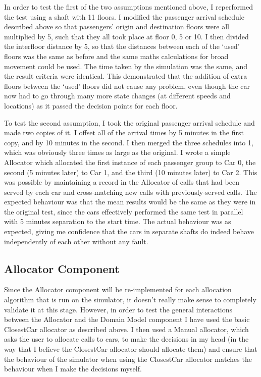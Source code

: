\documentclass{UoYCSproject}
\begin{document}
In order to test the first of the two assumptions mentioned above, I reperformed the test using a shaft with 11 floors.  I modified the passenger arrival schedule described above so that passengers' origin and destination floors were all multiplied by 5, such that they all took place at floor 0, 5 or 10.  I then divided the interfloor distance by 5, so that the distances between each of the `used' floors was the same as before and the same maths calculations for broad movement could be used.  The time taken by the simulation was the same, and the result criteria were identical.  This demonstrated that the addition of extra floors between the `used' floors did not cause any problem, even though the car now had to go through many more state changes (at different speeds and locations) as it passed the decision points for each floor.

To test the second assumption, I took the original passenger arrival schedule and made two copies of it.  I offset all of the arrival times by 5 minutes in the first copy, and by 10 minutes in the second.  I then merged the three schedules into 1, which was obviously three times as large as the original.  I wrote a simple Allocator which allocated the first instance of each passenger group to Car 0, the second (5 minutes later) to Car 1, and the third (10 minutes later) to Car 2.  This was possible by maintaining a record in the Allocator of calls that had been served by each car and cross-matching new calls with previously-served calls.  The expected behaviour was that the mean results would be the same as they were in the original test, since the cars effectively performed the same test in parallel with 5 minutes separation to the start time.  The actual behaviour was as expected, giving me confidence that the cars in separate shafts do indeed behave independently of each other without any fault.

\subsection{Allocator Component}

Since the Allocator component will be re-implemented for each allocation algorithm that is run on the simulator, it doesn't really make sense to completely validate it at this stage.  However, in order to test the general interactions between the Allocator and the Domain Model component I have used the basic ClosestCar allocator as described above.  I then used a Manual allocator, which asks the user to allocate calls to cars, to make the decisions in my head (in the way that I believe the ClosestCar allocator should allocate them) and ensure that the behaviour of the simulator when using the ClosestCar allocator matches the behaviour when I make the decisions myself.
\end{document}
